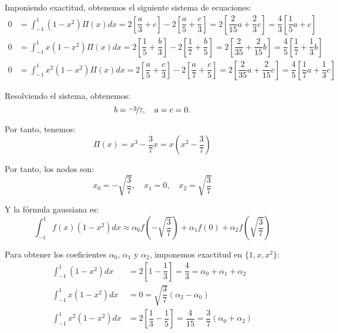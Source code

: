 \begin{ejercicio}
\begin{enumerate}
        Imponiendo exactitud, obtenemos el siguiente sistema de ecuaciones:
        \begin{align*}
            0 &= \int_{-1}^{1} (1-x^2)\Pi(x)dx = 2\left[\dfrac{a}{3} + c\right] - 2\left[\dfrac{a}{5} + \dfrac{c}{3}\right]
            = 2\left[\dfrac{2}{15}a + \dfrac{2}{3}c\right] = \dfrac{4}{3}\left[\dfrac{1}{5}a + c\right]\\
            0 &= \int_{-1}^{1} x(1-x^2)\Pi(x)dx = 2\left[\dfrac{1}{5} + \dfrac{b}{3}\right] - 2\left[\dfrac{1}{7} + \dfrac{b}{5}\right]
            = 2\left[\dfrac{2}{35} + \dfrac{2}{15}b\right]
            = \dfrac{4}{5}\left[\dfrac{1}{7} + \dfrac{1}{3}b\right]\\
            0 &= \int_{-1}^{1} x^2(1-x^2)\Pi(x)dx = 2\left[\dfrac{a}{5} + \dfrac{c}{3}\right] - 2\left[\dfrac{a}{7} + \dfrac{c}{5}\right]
            = 2\left[\dfrac{2}{35}a + \dfrac{2}{15}c\right]
            = \dfrac{4}{5}\left[\dfrac{1}{7}a + \dfrac{1}{3}c\right]
        \end{align*}

        Resolviendo el sistema, obtenemos:
        \begin{equation*}
            b=\nicefrac{-3}{7}, \quad a=c=0.
        \end{equation*}

        Por tanto, tenemos:
        \begin{equation*}
            \Pi(x) = x^3 - \frac{3}{7}x = x\left(x^2 - \frac{3}{7}\right)
        \end{equation*}

        Por tanto, los nodos son:
        \begin{equation*}
            x_0 = -\sqrt{\frac{3}{7}}, \quad x_1 = 0, \quad x_2 = \sqrt{\frac{3}{7}}
        \end{equation*}

        Y la fórmula gaussiana es:
        \begin{equation*}
            \int_{-1}^{1} f(x)(1 - x^2)dx \approx \alpha_0 f\left(-\sqrt{\frac{3}{7}}\right) + \alpha_1 f(0) + \alpha_2 f\left(\sqrt{\frac{3}{7}}\right)
        \end{equation*}

        Para obtener los coeficientes $\alpha_0$, $\alpha_1$ y $\alpha_2$, imponemos exactitud en $\{1, x, x^2\}$:
        \begin{align*}
            \int_{-1}^{1} (1 - x^2)dx &= 2\left[1 - \dfrac{1}{3}\right] = \dfrac{4}{3} = \alpha_0 + \alpha_1 + \alpha_2\\
            \int_{-1}^{1} x(1 - x^2)dx &= 0 = \sqrt{\dfrac{3}{7}}\left(\alpha_2 - \alpha_0\right)\\
            \int_{-1}^{1} x^2(1 - x^2)dx &= 2\left[\dfrac{1}{3} - \dfrac{1}{5}\right] = \dfrac{4}{15} = {\dfrac{3}{7}}\left(\alpha_0 + \alpha_2\right)
        \end{align*}


\end{enumerate}
\end{ejercicio}

